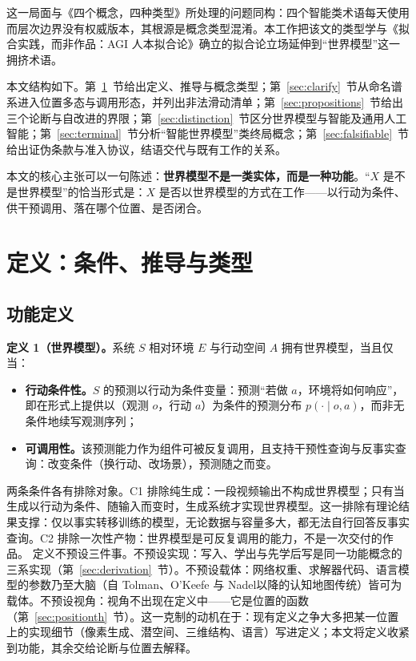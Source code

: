 \documentclass[10pt,fontset=fandol]{ctexart}
\begin{document}
这一局面与《四个概念，四种类型》\cite{yu2026fourconcepts}所处理的问题同构：四个智能类术语每天使用而层次边界没有权威版本，其根源是概念类型混淆。本工作把该文的类型学与《拟合实践，而非作品：AGI 人本拟合论》\cite{yu2026fitting}确立的拟合论立场延伸到“世界模型”这一拥挤术语。

本文结构如下。第~\ref{sec:definition}~节给出定义、推导与概念类型；第~\ref{sec:clarify}~节从命名谱系进入位置多态与调用形态，并列出非法滑动清单；第~\ref{sec:propositions}~节给出三个论断与自改进的界限；第~\ref{sec:distinction}~节区分世界模型与智能及通用人工智能；第~\ref{sec:terminal}~节分析“智能世界模型”类终局概念；第~\ref{sec:falsifiable}~节给出证伪条款与准入协议，结语交代与既有工作的关系。

本文的核心主张可以一句陈述：\textbf{世界模型不是一类实体，而是一种功能}。“$X$ 是不是世界模型”的恰当形式是：$X$ 是否以世界模型的方式在工作——以行动为条件、供干预调用、落在哪个位置、是否闭合。

\section{定义：条件、推导与类型}\label{sec:definition}

\subsection{功能定义}\label{sec:functional}

\textbf{定义 1（世界模型）。}系统 $S$ 相对环境 $E$ 与行动空间 $A$ 拥有世界模型，当且仅当：

\begin{itemize}
\item[（C1）]\textbf{行动条件性。}$S$ 的预测以行动为条件变量：预测“若做 $a$，环境将如何响应”，即在形式上提供以（观测 $o$，行动 $a$）为条件的预测分布 $p(\cdot\mid o,a)$，而非无条件地续写观测序列；
\item[（C2）]\textbf{可调用性。}该预测能力作为组件可被反复调用，且支持干预性查询与反事实查询：改变条件（换行动、改场景），预测随之而变。
\end{itemize}

两条条件各有排除对象。C1 排除纯生成：一段视频输出不构成世界模型；只有当生成以行动为条件、随输入而变时，生成系统才实现世界模型。这一排除有理论结果支撑：仅以事实转移训练的模型，无论数据与容量多大，都无法自行回答反事实查询\cite{balestriero2026counterfactual}。C2 排除一次性产物：世界模型是可反复调用的能力，不是一次交付的作品。
定义不预设三件事。不预设实现：写入、学出与先学后写是同一功能概念的三系实现（第~\ref{sec:derivation}~节）。不预设载体：网络权重、求解器代码、语言模型的参数乃至大脑（自 Tolman\cite{tolman1948}、O'Keefe 与 Nadel\cite{okeefe1978}以降的认知地图传统）皆可为载体。不预设视角：视角不出现在定义中——它是位置的函数（第~\ref{sec:positionth}~节）。这一克制的动机在于：现有定义之争大多把某一位置上的实现细节（像素生成、潜空间、三维结构、语言）写进定义；本文将定义收紧到功能，其余交给论断与位置去解释。
\end{document}
